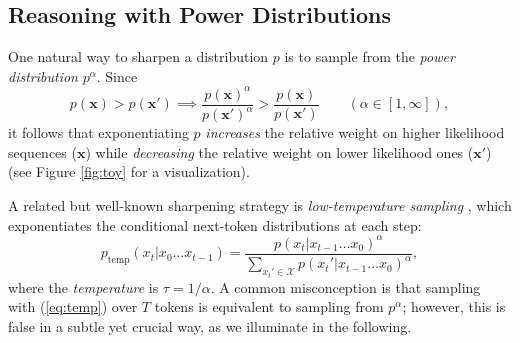 \documentclass{article}
\newcommand{\yilun}[1]{{\color{red} [yilun: #1]}}
\begin{document}
\subsection{Reasoning with Power Distributions}\label{subsec:pow}

One natural way to sharpen a distribution $p$ is to sample from the \textit{power distribution} $p^{\alpha}$. Since 
\begin{equation}
    p(\mathbf{x}) > p(\mathbf{x'}) \implies \frac{p(\mathbf{x})^{\alpha}}{p(\mathbf{x'})^{\alpha}} > \frac{p(\mathbf{x})}{p(\mathbf{x'})} \qquad (\alpha \in [1, \infty]),
\end{equation}
it follows that exponentiating $p$ \textit{increases} the relative weight on higher likelihood sequences ($\mathbf{x}$) while \textit{decreasing} the relative weight on lower likelihood ones ($\mathbf{x'}$) (see Figure \ref{fig:toy} for a visualization).

 

A related but well-known sharpening strategy is  \textit{low-temperature sampling} \citep{wang2020contextualtemperature}, which exponentiates the conditional next-token distributions at each step:
% 
\begin{equation}\label{eq:temp}
     p_{\text{temp}}(x_t | x_0 \dots x_{t-1}) = \frac{p(x_t | x_{t-1}\dots x_0)^{\alpha}}{\sum_{x_t' \in \mathcal{X}} p(x_t' | x_{t-1}\dots x_0)^{\alpha}},
\end{equation}
% 
% 
% 
where the \textit{temperature} is $\tau = 1/\alpha$. A common misconception is that sampling with (\ref{eq:temp}) over $T$ tokens is equivalent to sampling from $p^{\alpha}$; however, this is false in a subtle yet crucial way, as we illuminate in the following. 

\end{document}

